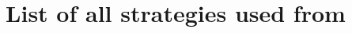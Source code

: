 \documentclass[a4paper]{article}
\title{List of all strategies used from \cite{Knight2018}}
\author{}
\date{}
\begin{document}
\maketitle


\begin{enumerate}
    
\end{enumerate}

\printbibliography
\end{document}
